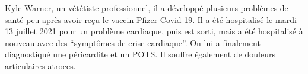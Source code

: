 Kyle Warner, un vététiste professionnel, il a développé plusieurs problèmes de
santé peu après avoir reçu le vaccin Pfizer Covid-19. Il a été hospitalisé le
mardi 13 juillet 2021 pour un problème cardiaque, puis est sorti, mais a été
hospitalisé à nouveau avec des ``symptômes de crise cardiaque''. On lui a
finalement diagnostiqué une péricardite et un POTS. Il souffre également de
douleurs articulaires atroces.
